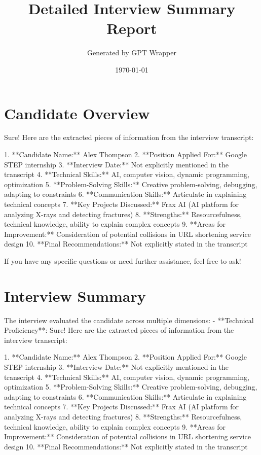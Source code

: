 \documentclass{article}
\title{Detailed Interview Summary Report}
\author{Generated by GPT Wrapper}
\date{\today}
\begin{document}
\maketitle

\section{Candidate Overview}
Sure! Here are the extracted pieces of information from the interview transcript:

1. **Candidate Name:** Alex Thompson
2. **Position Applied For:** Google STEP internship
3. **Interview Date:** Not explicitly mentioned in the transcript
4. **Technical Skills:** AI, computer vision, dynamic programming, optimization
5. **Problem-Solving Skills:** Creative problem-solving, debugging, adapting to constraints
6. **Communication Skills:** Articulate in explaining technical concepts
7. **Key Projects Discussed:** Frax AI (AI platform for analyzing X-rays and detecting fractures)
8. **Strengths:** Resourcefulness, technical knowledge, ability to explain complex concepts
9. **Areas for Improvement:** Consideration of potential collisions in URL shortening service design
10. **Final Recommendations:** Not explicitly stated in the transcript

If you have any specific questions or need further assistance, feel free to ask!

\section{Interview Summary}
The interview evaluated the candidate across multiple dimensions:
- **Technical Proficiency**: Sure! Here are the extracted pieces of information from the interview transcript:

1. **Candidate Name:** Alex Thompson
2. **Position Applied For:** Google STEP internship
3. **Interview Date:** Not explicitly mentioned in the transcript
4. **Technical Skills:** AI, computer vision, dynamic programming, optimization
5. **Problem-Solving Skills:** Creative problem-solving, debugging, adapting to constraints
6. **Communication Skills:** Articulate in explaining technical concepts
7. **Key Projects Discussed:** Frax AI (AI platform for analyzing X-rays and detecting fractures)
8. **Strengths:** Resourcefulness, technical knowledge, ability to explain complex concepts
9. **Areas for Improvement:** Consideration of potential collisions in URL shortening service design
10. **Final Recommendations:** Not explicitly stated in the transcript
\end{document}
